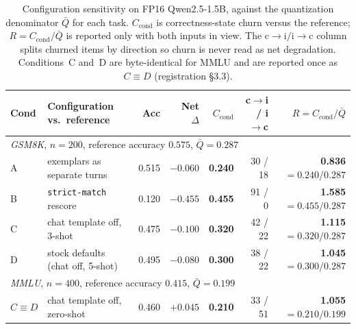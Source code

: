 \begin{table}[!t]
\centering
\small
\caption{Configuration sensitivity on FP16 Qwen2.5-1.5B, against the
quantization denominator $\bar{Q}$ for each task. $C_{\mathrm{cond}}$ is
correctness-state churn versus the reference; $R=C_{\mathrm{cond}}/\bar{Q}$ is
reported only with both inputs in view. The
$\text{c}{\to}\text{i}/\text{i}{\to}\text{c}$ column splits churned items by
direction so churn is never read as net degradation. Conditions~C and~D are
byte-identical for MMLU and are reported once as $C\equiv D$ (registration
\S3.3).}
\label{tab:sensitivity}
\setlength{\tabcolsep}{2pt}
\small
\begin{tabular}{l>{\raggedright\arraybackslash}p{2.7cm}rrrrr}
\toprule
Cond & Configuration vs.\ reference & Acc & Net $\Delta$ & $C_{\mathrm{cond}}$ & c$\to$i / i$\to$c & $R=C_{\mathrm{cond}}/\bar{Q}$ \\
\midrule
\multicolumn{7}{l}{\emph{GSM8K}, $n=200$, reference accuracy $0.575$, $\bar{Q}=0.287$} \\
A & exemplars as separate turns   & 0.515 & $-0.060$ & \textbf{0.240} & 30 / 18 & \textbf{0.836} $=0.240/0.287$ \\
B & \texttt{strict-match} rescore & 0.120 & $-0.455$ & \textbf{0.455} & 91 / 0  & \textbf{1.585} $=0.455/0.287$ \\
C & chat template off, 3-shot     & 0.475 & $-0.100$ & \textbf{0.320} & 42 / 22 & \textbf{1.115} $=0.320/0.287$ \\
D & stock defaults (chat off, 5-shot) & 0.495 & $-0.080$ & \textbf{0.300} & 38 / 22 & \textbf{1.045} $=0.300/0.287$ \\
\midrule
\multicolumn{7}{l}{\emph{MMLU}, $n=400$, reference accuracy $0.415$, $\bar{Q}=0.199$} \\
$C\equiv D$ & chat template off, zero-shot & 0.460 & $\mathbf{+0.045}$ & \textbf{0.210} & 33 / 51 & \textbf{1.055} $=0.210/0.199$ \\
\bottomrule
\end{tabular}
\end{table}

